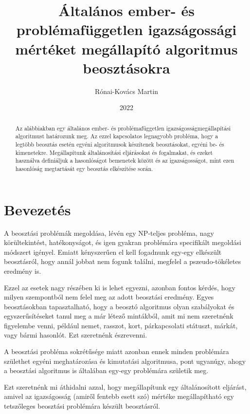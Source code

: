 \documentclass[twocolumn]{article}
\title{Általános ember- és problémafüggetlen igazságossági mértéket megállapító algoritmus beosztásokra}
\author{Rónai-Kovács Martin}
\date{2022}
\theoremstyle{definition}
\begin{document}
\maketitle

\begin{abstract}
    Az alábbiakban egy általános ember- és problémafüggetlen igazságosságmegállapítási algoritmust határozunk meg. Az ezzel kapcsolatos legnagyobb probléma, hogy a legtöbb beosztás esetén egyéni algoritmusok készítenek beosztásokat, egyéni be- és kimenetekre. Megállapítunk általánosítási eljárásokat és fogalmakat, és ezeket használva definiáljuk a hasonlóságot bemenetek között és az igazságosságot, mint ezen hasonlóság megtartását egy beosztás elkészítése során. 
\end{abstract}

\section{Bevezetés}
    A beosztási problémák megoldása, lévén egy NP-teljes probléma, nagy körültekintést, hatékonyságot, és igen gyakran problémára specifikált megoldási módszert igényel. Emiatt kényszerűen el kell fogadnunk egy-egy elkészült beosztásról, hogy annál jobbat nem fogunk találni, megfelel a pszeudo-tökéletes eredmény is. 
    
    Ezzel az esetek nagy részében ki is lehet egyezni, azonban fontos kérdés, hogy milyen szempontból nem felel meg az adott beosztási eredmény. Egyes beosztásokban tapasztalható, hogy a beosztó algoritmus olyan szabályokat és egyszerűsítéseket tanul meg a már létező mintákból, amit mi nem szeretnénk figyelembe venni, például nemet, rasszot, kort, párkapcsolati státuszt, márkát, vagy bármi hasonlót. Ezt szeretnénk észrevenni.
    
    A beosztási probléma sokrétűsége miatt azonban ennek minden problémára születhet egyéni meghatározása és kimutatási algoritmusa, pont ugyanúgy, ahogy a beosztási algoritmus is általában egy-egy problémára születik meg.
    
    Ezt szeretnénk mi áthidalni azzal, hogy megállapítunk egy általánosított eljárást, amivel az igazságosság (amiről fentebb esett szó) mértéke megállapítható egy tetszőleges beosztási problémára készült beosztásról.
    
\end{document}
